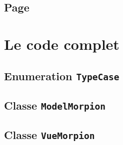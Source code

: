 \documentclass{article}
\begin{document}
	\subsection{Page }
	
	\newpage
	\appendix
	\section{Le code complet}
	\subsection{Enumeration \texttt{TypeCase}}
	
	\subsection{Classe \texttt{ModelMorpion}}
	
	\subsection{Classe \texttt{VueMorpion}}
	
\end{document}
